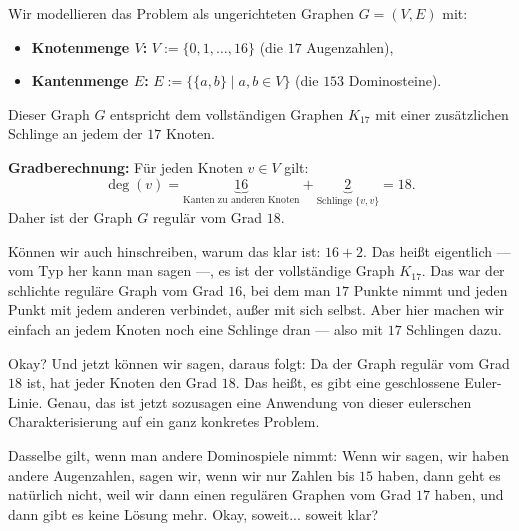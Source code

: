 \begin{math-stroke}
Wir modellieren das Problem als ungerichteten Graphen $G = (V, E)$ mit:
\begin{itemize}
    \item \textbf{Knotenmenge $V$:} $V := \{0, 1, \dots, 16\}$ (die $17$ Augenzahlen),
    \item \textbf{Kantenmenge $E$:} $E := \{\{a, b\} \mid a, b \in V\}$ (die $153$ Dominosteine).
\end{itemize}
\par\vspace{1ex}\noindent
Dieser Graph $G$ entspricht dem vollständigen Graphen $K_{17}$ mit einer zusätzlichen Schlinge an jedem der $17$ Knoten.
\par\vspace{1ex}\noindent
\textbf{Gradberechnung:} Für jeden Knoten $v \in V$ gilt:
\[
\deg(v) = \underbrace{16}_{\text{Kanten zu anderen Knoten}} + \underbrace{2}_{\text{Schlinge } \{v, v\}} = 18.
\]
Daher ist der Graph $G$ regulär vom Grad $18$.
\end{math-stroke}

\begin{spoken-clean}[00:23:00 - 00:26:34]
Können wir auch hinschreiben, warum das klar ist: $16 + 2$. Das heißt eigentlich --- vom Typ her kann man sagen ---, es ist der vollständige Graph $K_{17}$. Das war der schlichte reguläre Graph vom Grad $16$, bei dem man $17$ Punkte nimmt und jeden Punkt mit jedem anderen verbindet, außer mit sich selbst. Aber hier machen wir einfach an jedem Knoten noch eine Schlinge dran --- also mit $17$ Schlingen dazu. 

Okay? Und jetzt können wir sagen, daraus folgt: Da der Graph regulär vom Grad $18$ ist, hat jeder Knoten den Grad $18$. Das heißt, es gibt eine geschlossene Euler-Linie.  Genau, das ist jetzt sozusagen eine Anwendung von dieser eulerschen Charakterisierung auf ein ganz konkretes Problem.

Dasselbe gilt, wenn man andere Dominospiele nimmt: Wenn wir sagen, wir haben andere Augenzahlen, sagen wir, wenn wir nur Zahlen bis $15$ haben, dann geht es natürlich nicht, weil wir dann einen regulären Graphen vom Grad $17$ haben, und dann gibt es keine Lösung mehr. Okay, soweit... soweit klar? 
\end{spoken-clean}

